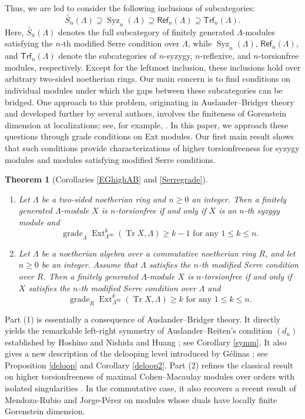 \documentclass{amsart}
\newtheorem{thm}{Theorem}[section]
\theoremstyle{definition}
\theoremstyle{remark}
\numberwithin{equation}{thm}
\def\Ext{\operatorname{Ext}}
\def\ge{\geqslant}
\def\grade{\operatorname{grade}}
\def\le{\leqslant}
\def\refl{\mathsf{Ref}}
\def\Syz{\operatorname{Syz}}
\def\Trf{\mathsf{Trf}}
\def\tr{\operatorname{Tr}}
\begin{document}
Thus, we are led to consider the following inclusions of subcategories:
$$
\widetilde{S_n}(\Lambda)\supseteq\Syz_n(\Lambda)\supseteq\refl_n(\Lambda)\supseteq\Trf_n(\Lambda).
$$
Here, $\widetilde{S_n}(\Lambda)$ denotes the full subcategory of finitely generated $\Lambda$-modules satisfying the $n$-th modified Serre condition over $\Lambda$, while $\Syz_n(\Lambda)$, $\refl_n(\Lambda)$, and $\Trf_n(\Lambda)$ denote the subcategories of $n$-syzygy, $n$-reflexive, and $n$-torsionfree modules, respectively. Except for the leftmost inclusion, these inclusions hold over arbitrary two-sided noetherian rings.
Our main concern is to find conditions on individual modules under which the gaps between these subcategories can be bridged. One approach to this problem, originating in Auslander--Bridger theory and developed further by several authors, involves the finiteness of Gorenstein dimension at localizations; see, for example, \cite{AB,Masek,MJ}. In this paper, we approach these questions through grade conditions on Ext modules. Our first main result shows that such conditions provide characterizations of higher torsionfreeness for syzygy modules and modules satisfying modified Serre conditions.

\begin{thm}[Corollaries \ref{EGhighAB} and \ref{Serregrade}]\label{main1}
\begin{enumerate}[\rm(1)]
   \item Let $\Lambda$ be a two-sided noetherian ring and $n\ge0$ an integer. Then a finitely generated $\Lambda$-module $X$ is $n$-torsionfree if and only if $X$ is an $n$-th syzygy module and 
   $$
   \grade_\Lambda\Ext^k_{\Lambda^{\mathrm{op}}}(\tr X,\Lambda)\ge k-1\text{ for any }1\le k\le n.
   $$
   \item Let $\Lambda$ be a noetherian algebra over a commutative noetherian ring $R$, and let $n\ge0$ be an integer. Assume that $\Lambda$ satisfies the $n$-th modified Serre condition over $R$. Then a finitely generated $\Lambda$-module $X$ is $n$-torsionfree if and only if $X$ satisfies the $n$-th modified Serre condition over $\Lambda$ and
   $$
   \grade_R\Ext^k_{\Lambda^{\mathrm{op}}}(\tr X,\Lambda)\ge k \text{ for any }1\le k\le n.
   $$
\end{enumerate}
\end{thm}

Part (1) is essentially a consequence of Auslander--Bridger theory. It directly yields the remarkable left-right symmetry of Auslander--Reiten's condition $(d_n)$ established by Hoshino and Nishida \cite{HN} and Huang \cite{Hu08}; see Corollary \ref{symm}. It also gives a new description of the delooping level introduced by G\'elinas \cite{Gel}; see Proposition \ref{deloop} and Corollary \ref{deloop2}. Part (2) refines the classical result on higher torsionfreeness of maximal Cohen--Macaulay modules over orders with isolated singularities \cite{Aus78,EG,LW,Yos90}. In the commutative case, it also recovers a recent result of Mendoza-Rubio and Jorge-P\'erez \cite[Theorem 1.1]{MJ} on modules whose duals have locally finite Gorenstein dimension.
\end{document}
